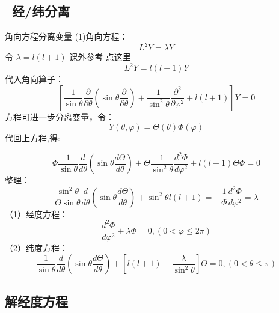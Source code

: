 \subsection{ 经/纬分离}


	{角向方程分离变量}
	(1)角向方程：
	\begin{equation*}
		L^2 Y=\lambda Y
	\end{equation*}	
	令 $\lambda=l(l+1) $ 课外参考 \href{https://zhuanlan.zhihu.com/p/133865994}{点这里}
	\begin{equation*}
		L^2 Y=l(l+1) Y
	\end{equation*}	
	代入角向算子：
	\begin{equation*}
		\left[ \frac{1}{ \sin \theta  } \frac{\partial }{\partial \theta } (\sin \theta \frac{\partial }{\partial \theta } )
		+\frac{1}{ \sin^2 \theta  } \frac{\partial^2}{\partial\varphi ^2}  +l(l+1) \right] Y=0 
	\end{equation*}	
	方程可进一步分离变量，令：
	\begin{equation*}
		Y(\theta,\varphi)= \Theta(\theta) \Phi(\varphi)
	\end{equation*}	
	代回上方程,得:
	


	\begin{equation*}
		\Phi \frac{1}{\sin \theta} \frac{d}{d \theta}\left(\sin \theta \frac{d \Theta}{d \theta}\right)+\Theta \frac{1}{\sin ^{2} \theta} \frac{d^{2} \Phi}{d \varphi^{2}}+l(l+1) \Theta \Phi=0
	\end{equation*}	
	整理：
	\begin{equation*}
		\frac{\sin ^{2} \theta}{\Theta \sin \theta} \frac{d}{d \theta}\left(\sin \theta \frac{d \Theta}{d \theta}\right)+\sin ^{2} \theta l(l+1)=-\frac{1}{\Phi} \frac{d^{2} \Phi}{d \varphi^{2}}=\lambda
	\end{equation*}	
	（1）经度方程：
	\begin{equation*}
		\frac{d^{2} \Phi}{d \varphi^{2}}+\lambda \Phi=0,(0<\varphi\le2 \pi)
	\end{equation*}	
	（2）纬度方程：
	\begin{equation*}
		\frac{1}{\sin \theta} \frac{d}{d \theta}\left(\sin \theta \frac{d \Theta}{d \theta}\right)+\left[l(l+1)-\frac{\lambda}{\sin ^{2} \theta}\right] \Theta=0,(0<\theta \le \pi)
	\end{equation*}	
	

\subsection{解经度方程}


